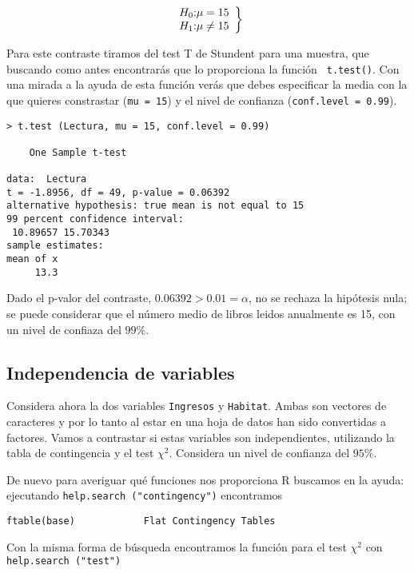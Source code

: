 $$
\left.
\begin{array}{r@{:}l}
H_0 & \mu     = 15 \\
H_1 & \mu \not= 15
\end{array}\right\}
$$

Para este contraste  tiramos del test T de Stundent  para una muestra,
que buscando como antes encontrarás que lo proporciona la función {\tt
t.test()}. Con una  mirada a la ayuda de esta  función verás que debes
especificar la media con la que  quieres constrastar ({\tt mu = 15}) y
el nivel de confianza ({\tt conf.level = 0.99}).


\begin{verbatim}
> t.test (Lectura, mu = 15, conf.level = 0.99)

	One Sample t-test

data:  Lectura 
t = -1.8956, df = 49, p-value = 0.06392
alternative hypothesis: true mean is not equal to 15 
99 percent confidence interval:
 10.89657 15.70343 
sample estimates:
mean of x 
     13.3 

\end{verbatim}

Dado  el p-valor  del  contraste, $0.06392  > 0.01  =  \alpha$, no  se
rechaza la hipótesis nula; se puede  considerar que el número medio de
libros leidos anualmente es 15, con un nivel de confiaza del $99\%$.

\subsection*{Independencia de variables}


Considera ahora la dos variables {\tt Ingresos} y {\tt Habitat}. Ambas
son vectores  de caracteres  y por lo  tanto al estar  en una  hoja de
datos han  sido convertidas  a factores. Vamos  a contrastar  si estas
variables son independientes, utilizando la tabla de contingencia y el
test $\chi^2$. Considera un nivel de confianza del $95\%$.

De nuevo para averiguar qué funciones nos proporciona {\sf R} buscamos
en la ayuda: ejecutando \verb|help.search ("contingency")| encontramos

\begin{verbatim}
ftable(base)            Flat Contingency Tables
\end{verbatim}

Con la  misma forma de  búsqueda encontramos  la función para  el test
$\chi^2$ con \verb|help.search ("test")|

